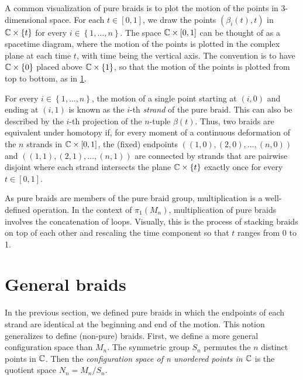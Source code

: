 A common visualization of pure braids is to plot the motion of the points in 3-dimensional space. For each $t\in [0,1]$, we draw the points $\left( \beta_i(t),t \right)$ in $\mathbb{C}\times\left\{ t \right\}$ for every $i\in\left\{ 1,\dots,n \right\}$. The space $\mathbb{C}\times[0,1]$ can be thought of as a spacetime diagram, where the motion of the points is plotted in the complex plane at each time $t$, with time being the vertical axis. The convention is to have $\mathbb{C}\times\left\{ 0 \right\}$ placed above $\mathbb{C}\times\left\{ 1 \right\}$, so that the motion of the points is plotted from top to bottom, as in \cref{fig:C_pure_braid}.

\begin{figure}[htbp]
    \centering
    
    \label{fig:C_pure_braid}
\end{figure}

For every $i\in\left\{ 1,\dots,n \right\}$, the motion of a single point starting at $(i,0)$ and ending at $(i,1)$ is known as the $i$-th \textit{strand} of the pure braid. This can also be described by the $i$-th projection of the $n$-tuple $\beta(t)$. Thus, two braids are equivalent under homotopy if, for every moment of a continuous deformation of the $n$ strands in $\mathbb{C}\times [0,1]$, the (fixed) endpoints $((1,0),(2,0),\dots,(n,0))$ and $((1,1),(2,1),\dots,(n,1))$ are connected by strands that are pairwise disjoint where each strand intersects the plane $\mathbb{C}\times\left\{ t \right\}$ exactly once for every $t\in[0,1]$.

As pure braids are members of the pure braid group, multiplication is a well-defined operation. In the context of $\pi_1(M_n)$, multiplication of pure braids involves the concatenation of loops. Visually, this is the process of stacking braids on top of each other and rescaling the time component so that $t$ ranges from 0 to 1.

\section{General braids}
In the previous section, we defined pure braids in which the endpoints of each strand are identical at the beginning and end of the motion. This notion generalizes to define (non-pure) braids. First, we define a more general configuration space than $M_n$. The symmetric group $S_n$ permutes the $n$ distinct points in $\mathbb{C}$. Then the \textit{configuration space of n unordered points in $\mathbb{C}$} is the quotient space $N_n = M_n/S_n$.

